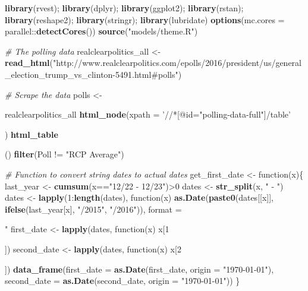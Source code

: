 \documentclass[]{book}
\newenvironment{Shaded}{\begin{snugshade}}{\end{snugshade}}
\newcommand{\KeywordTok}[1]{\textcolor[rgb]{0.13,0.29,0.53}{\textbf{{#1}}}}
\newcommand{\DataTypeTok}[1]{\textcolor[rgb]{0.13,0.29,0.53}{{#1}}}
\newcommand{\DecValTok}[1]{\textcolor[rgb]{0.00,0.00,0.81}{{#1}}}
\newcommand{\StringTok}[1]{\textcolor[rgb]{0.31,0.60,0.02}{{#1}}}
\newcommand{\CommentTok}[1]{\textcolor[rgb]{0.56,0.35,0.01}{\textit{{#1}}}}
\newcommand{\NormalTok}[1]{{#1}}
\begin{document}
\begin{Shaded}
\begin{Highlighting}[]
\KeywordTok{library}\NormalTok{(rvest); }\KeywordTok{library}\NormalTok{(dplyr); }\KeywordTok{library}\NormalTok{(ggplot2); }\KeywordTok{library}\NormalTok{(rstan); }\KeywordTok{library}\NormalTok{(reshape2); }\KeywordTok{library}\NormalTok{(stringr); }\KeywordTok{library}\NormalTok{(lubridate)}
\KeywordTok{options}\NormalTok{(}\DataTypeTok{mc.cores =} \NormalTok{parallel::}\KeywordTok{detectCores}\NormalTok{())}
\KeywordTok{source}\NormalTok{(}\StringTok{"models/theme.R"}\NormalTok{)}

\CommentTok{# The polling data}
\NormalTok{realclearpolitics_all <-}\StringTok{ }\KeywordTok{read_html}\NormalTok{(}\StringTok{"http://www.realclearpolitics.com/epolls/2016/president/us/general_election_trump_vs_clinton-5491.html#polls"}\NormalTok{)}

\CommentTok{# Scrape the data}
\NormalTok{polls <-}\StringTok{ }\NormalTok{realclearpolitics_all %>%}\StringTok{ }
\StringTok{  }\KeywordTok{html_node}\NormalTok{(}\DataTypeTok{xpath =} \StringTok{'//*[@id="polling-data-full"]/table'}\NormalTok{) %>%}\StringTok{ }
\StringTok{  }\KeywordTok{html_table}\NormalTok{() %>%}\StringTok{ }
\StringTok{  }\KeywordTok{filter}\NormalTok{(Poll !=}\StringTok{ "RCP Average"}\NormalTok{)}

\CommentTok{# Function to convert string dates to actual dates}
\NormalTok{get_first_date <-}\StringTok{ }\NormalTok{function(x)\{}
  \NormalTok{last_year <-}\StringTok{ }\KeywordTok{cumsum}\NormalTok{(x==}\StringTok{"12/22 - 12/23"}\NormalTok{)>}\DecValTok{0}
  \NormalTok{dates <-}\StringTok{ }\KeywordTok{str_split}\NormalTok{(x, }\StringTok{" - "}\NormalTok{)}
  \NormalTok{dates <-}\StringTok{ }\KeywordTok{lapply}\NormalTok{(}\DecValTok{1}\NormalTok{:}\KeywordTok{length}\NormalTok{(dates), function(x) }\KeywordTok{as.Date}\NormalTok{(}\KeywordTok{paste0}\NormalTok{(dates[[x]], }
                                                              \KeywordTok{ifelse}\NormalTok{(last_year[x], }\StringTok{"/2015"}\NormalTok{, }\StringTok{"/2016"}\NormalTok{)), }
                                                       \DataTypeTok{format =} \StringTok{"%m/%d/%Y"}\NormalTok{))}
  \NormalTok{first_date <-}\StringTok{ }\KeywordTok{lapply}\NormalTok{(dates, function(x) x[}\DecValTok{1}\NormalTok{]) %>%}\StringTok{ }\NormalTok{unlist}
  \NormalTok{second_date <-}\StringTok{ }\KeywordTok{lapply}\NormalTok{(dates, function(x) x[}\DecValTok{2}\NormalTok{])%>%}\StringTok{ }\NormalTok{unlist}
  \KeywordTok{data_frame}\NormalTok{(}\DataTypeTok{first_date =} \KeywordTok{as.Date}\NormalTok{(first_date, }\DataTypeTok{origin =} \StringTok{"1970-01-01"}\NormalTok{), }
             \DataTypeTok{second_date =} \KeywordTok{as.Date}\NormalTok{(second_date, }\DataTypeTok{origin =} \StringTok{"1970-01-01"}\NormalTok{))}
\NormalTok{\}}

}}}}}}
\end{Highlighting}
\end{Shaded}
\end{document}
